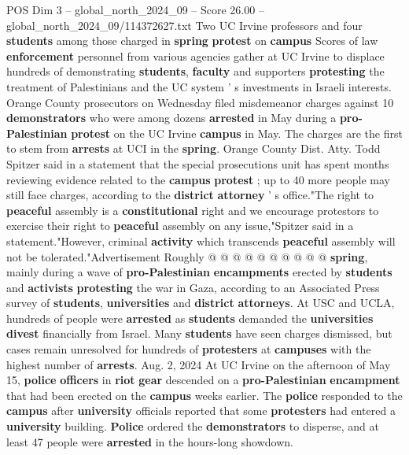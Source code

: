 \begin{textsample}{POS Dim 3 – global\_north\_2024\_09 – Score 26.00 – global\_north\_2024\_09/114372627.txt}  \label{ex:f3_pos_158}
Two UC Irvine professors and four \textbf{students} among those charged in \textbf{spring} \textbf{protest} on \textbf{campus} Scores of law \textbf{enforcement} personnel from various agencies gather at UC Irvine to displace hundreds of demonstrating \textbf{students}, \textbf{faculty} and supporters \textbf{protesting} the treatment of Palestinians and the UC system ' s investments in Israeli interests.
Orange County prosecutors on Wednesday filed misdemeanor charges against 10 \textbf{demonstrators} who were among dozens \textbf{arrested} in May during a \textbf{pro-Palestinian} \textbf{protest} on the UC Irvine \textbf{campus} in May.
The charges are the first to stem from \textbf{arrests} at UCI in the \textbf{spring}.
Orange County Dist.
Atty.
Todd Spitzer said in a statement that the special prosecutions unit has spent months reviewing evidence related to the \textbf{campus} \textbf{protest} ; up to 40 more people may still face charges, according to the \textbf{district} \textbf{attorney} ' s office."The right to \textbf{peaceful} assembly is a \textbf{constitutional} right and we encourage protestors to exercise their right to \textbf{peaceful} assembly on any issue,"Spitzer said in a statement."However, criminal \textbf{activity} which transcends \textbf{peaceful} assembly will not be tolerated."Advertisement Roughly @ @ @ @ @ @ @ @ @ @ \textbf{spring}, mainly during a wave of \textbf{pro-Palestinian} \textbf{encampments} erected by \textbf{students} and \textbf{activists} \textbf{protesting} the war in Gaza, according to an Associated Press survey of \textbf{students}, \textbf{universities} and \textbf{district} \textbf{attorneys}.
At USC and UCLA, hundreds of people were \textbf{arrested} as \textbf{students} demanded the \textbf{universities} \textbf{divest} financially from Israel.
Many \textbf{students} have seen charges dismissed, but cases remain unresolved for hundreds of \textbf{protesters} at \textbf{campuses} with the highest number of \textbf{arrests}.
Aug. 2, 2024 At UC Irvine on the afternoon of May 15, \textbf{police} \textbf{officers} in \textbf{riot} \textbf{gear} descended on a \textbf{pro-Palestinian} \textbf{encampment} that had been erected on the \textbf{campus} weeks earlier.
The \textbf{police} responded to the \textbf{campus} after \textbf{university} officials reported that some \textbf{protesters} had entered a \textbf{university} building. \textbf{Police} ordered the \textbf{demonstrators} to disperse, and at least 47 people were \textbf{arrested} in the hours-long showdown.

\end{textsample}

